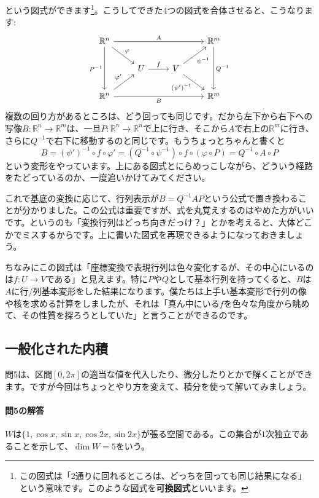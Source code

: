 という図式ができます\footnote{この図式は「$2$通りに回れるところは、どっちを回っても同じ結果になる」という意味です。このような図式を\textbf{可換図式}といいます。}。こうしてできた$4$つの図式を合体させると、こうなります: 
\[
\begin{tikzcd}
\mathbb{R}^n \arrow{rrr}{A}\arrow{rd}{\varphi} \arrow{dd}[swap]{P^{-1}} & & & \mathbb{R}^m \arrow{dd}{Q^{-1}} \\
& U \arrow{r}{f} & V \arrow{ru}[swap]{\psi^{-1}} \arrow{rd}[swap]{(\psi')^{-1}} & \\
\mathbb{R}^n \arrow{rrr}[swap]{B} \arrow{ru}{\varphi'} & & & \mathbb{R}^m
\end{tikzcd}
\]
複数の回り方があるところは、どう回っても同じです。だから左下から右下への写像$B\colon\mathbb{R}^n\rightarrow\mathbb{R}^m$は、一旦$P\colon\mathbb{R}^n\rightarrow\mathbb{R}^n$で上に行き、そこから$A$で右上の$\mathbb{R}^m$に行き、さらに$Q^{-1}$で右下に移動するのと同じです。もうちょっとちゃんと書くと
\[
B = (\psi')^{-1}\circ f \circ \varphi' = (Q^{-1}\circ\psi^{-1})\circ f\circ (\varphi\circ P) = Q^{-1}\circ A \circ P
\]
という変形をやっています。上にある図式とにらめっこしながら、どういう経路をたどっているのか、一度追いかけてみてください。

これで基底の変換に応じて、行列表示が$B = Q^{-1} A P$という公式で置き換わることが分かりました。この公式は重要ですが、式を丸覚えするのはやめた方がいいです。というのも「変換行列はどっち向きだっけ？」とかを考えると、大体どこかでミスするからです。上に書いた図式を再現できるようになっておきましょう。

ちなみにこの図式は「座標変換で表現行列は色々変化するが、その中心にいるのは$f\colon U\rightarrow V$である」と見えます。特に$P$や$Q$として基本行列を持ってくると、$B$は$A$に行/列基本変形をした結果になります。僕たちは上手い基本変形で行列の像や核を求める計算をしましたが、それは「真ん中にいる$f$を色々な角度から眺めて、その性質を探ろうとしていた」と言うことができるのです。

\subsection{一般化された内積}

問5は、区間$[0, 2\pi]$の適当な値を代入したり、微分したりとかで解くことができます。ですが今回はちょっとやり方を変えて、積分を使って解いてみましょう。

\paragraph{問5の解答} $W$は$\{1, \cos x, \sin x, \cos 2x, \sin 2x\}$が張る空間である。この集合が$1$次独立であることを示して、$\dim W = 5$をいう。

